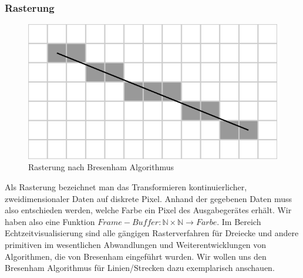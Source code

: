 \subsubsection{Rasterung}
\begin{figure}[H]
    \centering
    \includegraphics[width=1.0\textwidth]{images/bresenham.png}
    \caption{Rasterung nach Bresenham Algorithmus}
    \label{fig:screening-bresenham-line}
\end{figure}
Als Rasterung bezeichnet man das Transformieren kontinuierlicher, 
zweidimensionaler Daten auf diskrete Pixel. 
Anhand der gegebenen Daten muss also entschieden werden, welche Farbe ein Pixel des Ausgabegerätes erhält.
Wir haben also eine Funktion 
$Frame-Buffer: \mathbb{N} \times \mathbb{N} \to Farbe$. 
Im Bereich Echtzeitvisualisierung sind alle gängigen Rasterverfahren für 
Dreiecke und andere primitiven im wesentlichen Abwandlungen und 
Weiterentwicklungen von Algorithmen, die von Bresenham eingeführt wurden. 
Wir wollen uns den Bresenham Algorithmus für Linien/Strecken dazu exemplarisch 
anschauen.

